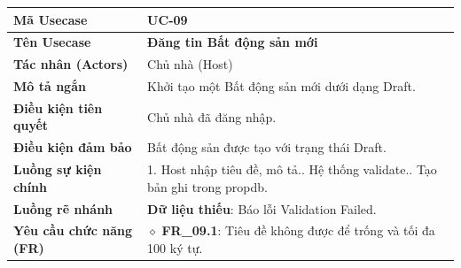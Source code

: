 \begin{table}[H]
\renewcommand{\arraystretch}{1.3}
\centering
\begin{tabularx}{\textwidth}{|p{4.5cm}|X|}
\hline
\cellcolor{gray!15}\bfseries Mã Usecase & \textbf{UC-09} \\ \hline
\cellcolor{gray!15}\bfseries Tên Usecase & \textbf{Đăng tin Bất động sản mới} \\ \hline
\cellcolor{gray!15}\bfseries Tác nhân (Actors) & Chủ nhà (Host) \\ \hline
\cellcolor{gray!15}\bfseries Mô tả ngắn & Khởi tạo một Bất động sản mới dưới dạng Draft. \\ \hline
\cellcolor{gray!15}\bfseries Điều kiện tiên quyết & Chủ nhà đã đăng nhập. \\ \hline
\cellcolor{gray!15}\bfseries Điều kiện đảm bảo & Bất động sản được tạo với trạng thái Draft. \\ \hline
\cellcolor{gray!15}\bfseries Luồng sự kiện chính & 1. Host nhập tiêu đề, mô tả.\newline 2. Hệ thống validate.\newline 3. Tạo bản ghi trong propdb. \\ \hline
\cellcolor{gray!15}\bfseries Luồng rẽ nhánh & \textbf{Dữ liệu thiếu}: Báo lỗi Validation Failed. \\ \hline
\cellcolor{gray!15}\bfseries Yêu cầu chức năng (FR) & $\diamond$ \textbf{FR\_09.1}: Tiêu đề không được để trống và tối đa 100 ký tự. \\ \hline
\end{tabularx}
\end{table}

